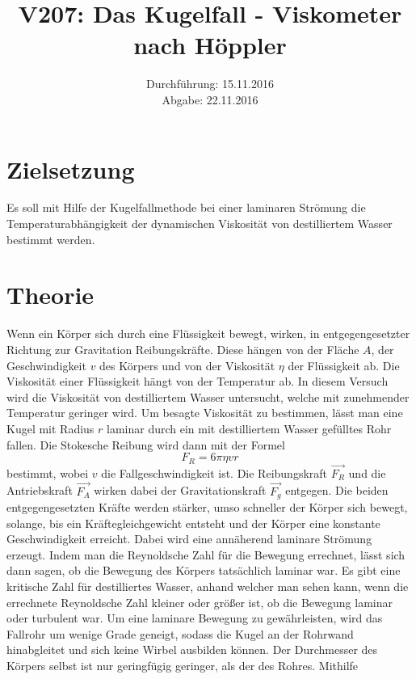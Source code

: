\documentclass[titlepage=firstiscover, bibliography=totoc, captions=tableheading]{scrartcl}
\title{V207: Das Kugelfall - Viskometer nach Höppler}
\author{
  Simon Schulte
  \texorpdfstring{
    \\
    \href{mailto:simon.schulte@udo.edu}{simon.schulte@udo.edu}
  }{}
  \texorpdfstring{\and}{, }
  Tim Sedlaczek
  \texorpdfstring{
    \\
    \href{mailto:tim.sedlaczek@udo.edu}{tim.sedlaczek@udo.edu}
  }{}
}
\date{Durchführung: 15.11.2016\\
      Abgabe: 22.11.2016}
\begin{document}
\maketitle
\thispagestyle{empty}
\tableofcontents
\newpage

\section{Zielsetzung}
\label{sec:zielsetzung}
Es soll mit Hilfe der Kugelfallmethode bei einer laminaren Strömung die
Temperaturabhängigkeit der dynamischen Viskosität von destilliertem Wasser
bestimmt werden.

\section{Theorie}
\label{sec:theorie}
Wenn ein Körper sich durch eine Flüssigkeit bewegt, wirken, in entgegengesetzter
Richtung zur Gravitation Reibungskräfte. Diese hängen von der Fläche $A$, der Geschwindigkeit $v$
des Körpers und von der Viskosität $\eta$ der Flüssigkeit ab. Die Viskosität
einer Flüssigkeit hängt von der Temperatur ab. In diesem Versuch wird die
Viskosität von destilliertem Wasser untersucht, welche mit zunehmender
Temperatur geringer wird. Um besagte Viskosität zu bestimmen, lässt man eine
Kugel mit Radius $r$ laminar durch ein mit destilliertem Wasser gefülltes Rohr
fallen. Die Stokesche Reibung wird dann mit der Formel
\begin{equation}
  F_R = 6 \pi \eta v r
  \label{eqn:stokes}
\end{equation}
bestimmt, wobei $v$ die Fallgeschwindigkeit ist. Die Reibungskraft $\vec{F_R}$
und die Antriebskraft $\vec{F_A}$ wirken dabei der Gravitationskraft $\vec{F_g}$
entgegen. Die beiden entgegengesetzten Kräfte werden stärker, umso schneller
der Körper sich bewegt, solange, bis ein Kräftegleichgewicht entsteht und der
Körper eine konstante Geschwindigkeit erreicht. Dabei wird eine annäherend
laminare Strömung erzeugt. Indem man die Reynoldsche Zahl für die Bewegung
errechnet, lässt sich dann sagen, ob die Bewegung des Körpers tatsächlich
laminar war. Es gibt eine kritische Zahl für destilliertes Wasser, anhand
welcher man sehen kann, wenn die errechnete Reynoldsche Zahl kleiner oder größer
ist, ob die Bewegung laminar oder turbulent war. Um eine laminare Bewegung zu
gewährleisten, wird das Fallrohr um wenige Grade geneigt, sodass die Kugel an der
Rohrwand hinabgleitet und sich keine Wirbel ausbilden können. Der Durchmesser
des Körpers selbst ist nur geringfügig geringer, als der des Rohres. Mithilfe
\end{document}
